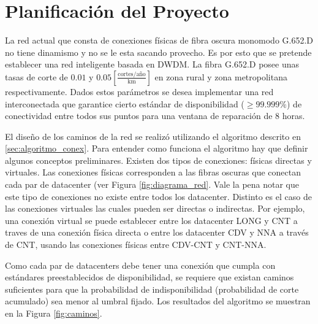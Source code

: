 \section{Planificaci\'on del Proyecto}\label{sec:planificacion}

La red actual que consta de conexiones físicas de fibra oscura monomodo G.652.D no tiene dinamismo y no se le esta sacando provecho. Es por esto que se pretende establecer una red inteligente basada en DWDM. La fibra G.652.D posee unas tasas de corte de $0.01$ y $0.05 [\frac{\text{cortes}/\text{año}}{\text{km}}]$ en zona rural y zona metropolitana respectivamente. Dados estos parámetros se desea implementar una red interconectada que garantice cierto estándar de disponibilidad ($\geq 99.999\%$) de conectividad entre todos sus puntos para una ventana de reparación de $8$ horas.

El diseño de los caminos de la red se realizó utilizando el algoritmo descrito en \ref{sec:algoritmo_conex}. Para entender como funciona el algoritmo hay que definir algunos conceptos preliminares. Existen dos tipos de conexiones: físicas directas y virtuales. Las conexiones físicas corresponden a las fibras oscuras que conectan cada par de datacenter (ver Figura \ref{fig:diagrama_red}. Vale la pena notar que este tipo de conexiones no existe entre todos los datacenter. Distinto es el caso de las conexiones virtuales las cuales pueden ser directas o indirectas. Por ejemplo, una conexión virtual se puede establecer entre los datacenter LONG y CNT a traves de una conexión física directa o entre los datacenter CDV y NNA a través de CNT, usando las conexiones físicas entre CDV-CNT y CNT-NNA.

Como cada par de datacenters debe tener una conexión que cumpla con estándares preestablecidos de disponibilidad, se requiere que existan caminos suficientes para que la probabilidad de indisponibilidad (probabilidad de corte acumulado) sea menor al umbral fijado. Los resultados del algoritmo se muestran en la Figura \ref{fig:caminos}.

